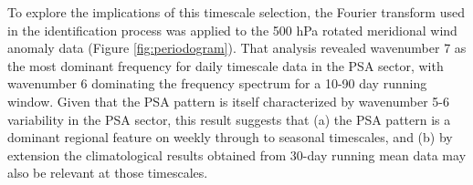 To explore the implications of this timescale selection, the Fourier transform used in the identification process was applied to the 500 hPa rotated meridional wind anomaly data (Figure \ref{fig:periodogram}). That analysis revealed wavenumber 7 as the most dominant frequency for daily timescale data in the PSA sector, with wavenumber 6 dominating the frequency spectrum for a 10-90 day running window. Given that the PSA pattern is itself characterized by wavenumber 5-6 variability in the PSA sector, this result suggests that (a) the PSA pattern is a dominant regional feature on weekly through to seasonal timescales, and (b) by extension the climatological results obtained from 30-day running mean data may also be relevant at those timescales.

